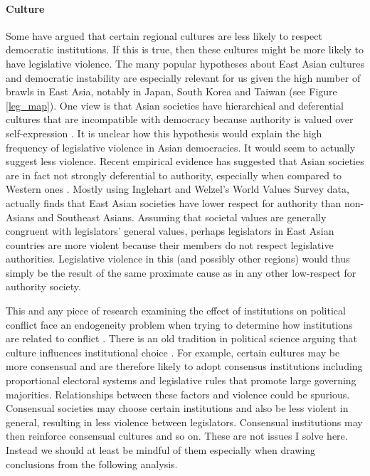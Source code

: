 \documentclass[a4paper]{article}\usepackage{graphicx, color}
\begin{document}
\paragraph{Culture}

Some have argued that certain regional cultures are less likely to respect democratic institutions. If this is true, then these cultures might be more likely to have legislative violence. The many popular hypotheses about East Asian cultures and democratic instability are especially relevant for us given the high number of brawls in East Asia, notably in Japan, South Korea and Taiwan (see Figure \ref{leg_map}). One view is that Asian societies have hierarchical and deferential cultures that are incompatible with democracy because authority is valued over self-expression \citep[see][212-213 for a discussion]{Dalton2005}. It is unclear how this hypothesis would explain the high frequency of legislative violence in Asian democracies. It would seem to actually suggest less violence. Recent empirical evidence has suggested that Asian societies are in fact not strongly deferential to authority, especially when compared to Western ones \citep{Dalton2005, KimAsianValues2010}. Mostly using Inglehart and Welzel's World Values Survey data, \cite{KimAsianValues2010} actually finds that East Asian societies have lower respect for authority than non-Asians and Southeast Asians. Assuming that societal values are generally congruent with legislators' general values, perhaps legislators in East Asian countries are more violent because their members do not respect legislative authorities. Legislative violence in this (and possibly other regions) would thus simply be the result of the same proximate cause as in any other low-respect for authority society.

This and any piece of research examining the effect of institutions on political conflict face an endogeneity problem when trying to determine how institutions are related to conflict \citep[][751]{Carey2000}. There is an old tradition in political science \citep[][528--529]{Frye1997} arguing that culture influences institutional choice \citep[in particular see][]{Almond1963}. For example, certain cultures may be more consensual and are therefore likely to adopt consensus institutions \citep[][22-23]{Lijphart2003} including proportional electoral systems and legislative rules that promote large governing majorities. Relationships between these factors and violence could be spurious. Consensual societies may choose certain institutions and also be less violent in general, resulting in less violence between legislators. Consensual institutions may then reinforce consensual cultures and so on. These are not issues I solve here. Instead we should at least be mindful of them especially when drawing conclusions from the following analysis.
\end{document}
